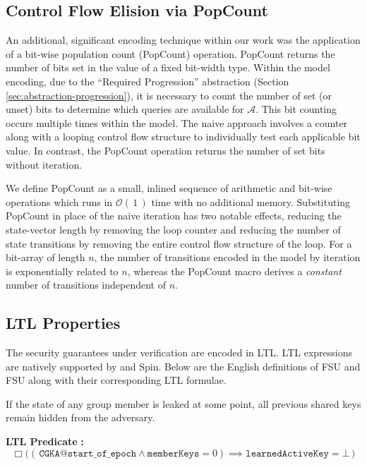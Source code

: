 \documentclass[runningheads]{llncs}
\newcommand{\Abrev}[1]{\gls{#1}}
\newcommand{\Adversary}{\ensuremath{\mathcal{A}}\xspace}
\newcommand{\BigO}[1]{\ensuremath{\mathcal{O}\left(\,#1\,\right)}\xspace}
\begin{document}
\subsection{Control Flow Elision via PopCount\label{sec:popcount}}

An additional, significant \Promela encoding technique within our work was the application of a bit-wise population count (PopCount) operation.
PopCount returns the number of bits set in the value of a fixed bit-width type.
Within the model encoding, due to the ``Required Progression''  abstraction (Section \ref{sec:abstraction-progression}), it is necessary to count the number of set (or unset) bits to determine which queries are available for \Adversary.
This bit counting occurs multiple times within the model.
The naive approach involves a counter along with a looping control flow structure to individually test each applicable bit value.
In contrast, the PopCount operation returns the number of set bits without iteration.

We define PopCount as a small, inlined sequence of arithmetic and bit-wise operations which runs in \BigO{1} time with no additional memory.
Substituting PopCount in place of the naive iteration has two notable effects, reducing the state-vector length by removing the loop counter and reducing the number of state transitions by removing the entire control flow structure of the loop.
For a bit-array of length $n$, the number of transitions encoded in the model by iteration is exponentially related to $n$, whereas the PopCount macro derives a \emph{constant} number of transitions independent of $n$.

\subsection{LTL Properties}

The security guarantees under verification are encoded in \Abrev{LTL}.
\Abrev{LTL} expressions are natively supported by \Promela and Spin.
Below are the English definitions of \Abrev{FSU} and \Abrev{FSU} along with their corresponding \Abrev{LTL} formulae.

\begin{definition}
If the state of any group member is leaked at some point, all previous shared keys remain hidden from the adversary.
\end{definition}%
\noindent\textbf{LTL Predicate} \textbf{:}%
\[%
\Box \Big( \left(\, \texttt{CGKA@start\_of\_epoch} \land \texttt{memberKeys} = 0\right) \implies \texttt{learnedActiveKey} = \bot \, \Big)%
\]%
\end{document}
